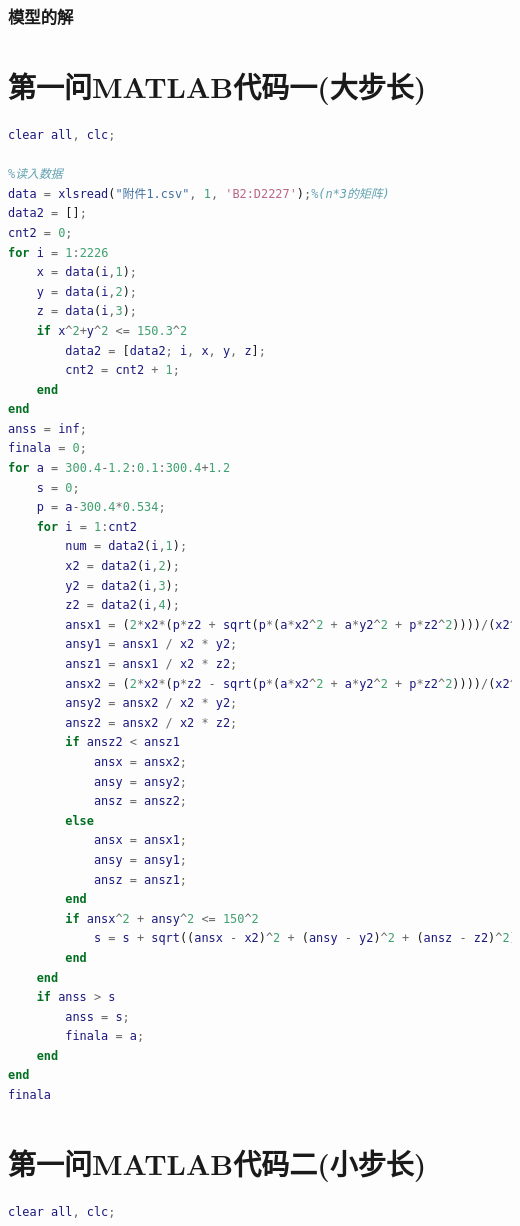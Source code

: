 \documentclass[withoutpreface,bwprint]{cumcmthesis} %
\begin{document}
\subsubsection{模型的解}
\nocite{宋叶志2019}

\begin{appendices}
\section{第一问MATLAB代码一(大步长)}
\begin{lstlisting}[language=matlab]
clear all, clc;

%读入数据
data = xlsread("附件1.csv", 1, 'B2:D2227');%(n*3的矩阵)
data2 = [];
cnt2 = 0;
for i = 1:2226
    x = data(i,1);
    y = data(i,2);
    z = data(i,3);
    if x^2+y^2 <= 150.3^2
        data2 = [data2; i, x, y, z];
        cnt2 = cnt2 + 1;
    end
end
anss = inf;
finala = 0;
for a = 300.4-1.2:0.1:300.4+1.2
    s = 0;
    p = a-300.4*0.534;
    for i = 1:cnt2
        num = data2(i,1);
        x2 = data2(i,2);
        y2 = data2(i,3);
        z2 = data2(i,4);
        ansx1 = (2*x2*(p*z2 + sqrt(p*(a*x2^2 + a*y2^2 + p*z2^2))))/(x2^2 + y2^2); 
        ansy1 = ansx1 / x2 * y2;
        ansz1 = ansx1 / x2 * z2;
        ansx2 = (2*x2*(p*z2 - sqrt(p*(a*x2^2 + a*y2^2 + p*z2^2))))/(x2^2 + y2^2);
        ansy2 = ansx2 / x2 * y2;
        ansz2 = ansx2 / x2 * z2;
        if ansz2 < ansz1
            ansx = ansx2;
            ansy = ansy2;
            ansz = ansz2;
        else
            ansx = ansx1;
            ansy = ansy1;
            ansz = ansz1;
        end
        if ansx^2 + ansy^2 <= 150^2
            s = s + sqrt((ansx - x2)^2 + (ansy - y2)^2 + (ansz - z2)^2);
        end
    end
    if anss > s
        anss = s;
        finala = a;
    end
end
finala
\end{lstlisting}
\section{第一问MATLAB代码二(小步长)}
\begin{lstlisting}[language=matlab]
clear all, clc;


\end{lstlisting}
\end{appendices}
\end{document}
